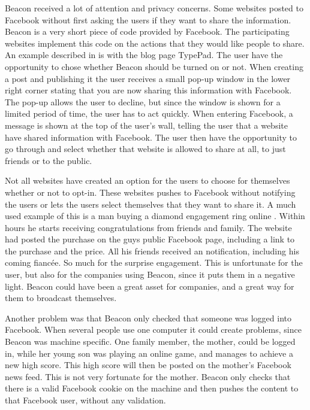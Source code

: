 Beacon received a lot of attention and privacy concerns. Some websites posted to Facebook without first asking the users if they want to share the information. Beacon is a very short piece of code provided by Facebook. The participating websites implement this code on the actions that they would like people to share. An example described in \cite{beaconMarketsPerspective} is with the blog page TypePad. The user have the opportunity to chose whether Beacon should be turned on or not. When creating a post and publishing it the user receives a small pop-up window in the lower right corner stating that you are now sharing this information with Facebook. The pop-up allows the user to decline, but since the window is shown for a limited period of time, the user has to act quickly. When entering Facebook, a message is shown at the top of the user's wall, telling the user that a website have shared information with Facebook. The user then have the opportunity to go through and select whether that website is allowed to share at all, to just friends or to the public.  

Not all websites have created an option for the users to choose for themselves whether or not to opt-in. These websites pushes to Facebook without notifying the users or lets the users select themselves that they want to share it. A much used example of this is a man buying a diamond engagement ring online \cite{ring}. Within hours he starts receiving congratulations from friends and family. The website had posted the purchase on the guys public Facebook page, including a link to the purchase and the price. All his friends received an notification, including his coming fiancée. So much for the surprise engagement.
This is unfortunate for the user, but also for the companies using Beacon, since it puts them in a negative light. Beacon could have been a great asset for companies, and a great way for them to broadcast themselves. 

Another problem was that Beacon only checked that someone was logged into Facebook. When several people use one computer it could create problems, since Beacon was machine specific. One family member, the mother, could be logged in, while her young son was playing an online game, and manages to achieve a new high score. This high score will then be posted on the mother's Facebook news feed. This is not very fortunate for the mother. Beacon only checks that there is a valid Facebook cookie on the machine and then pushes the content to that Facebook user, without any validation. 

